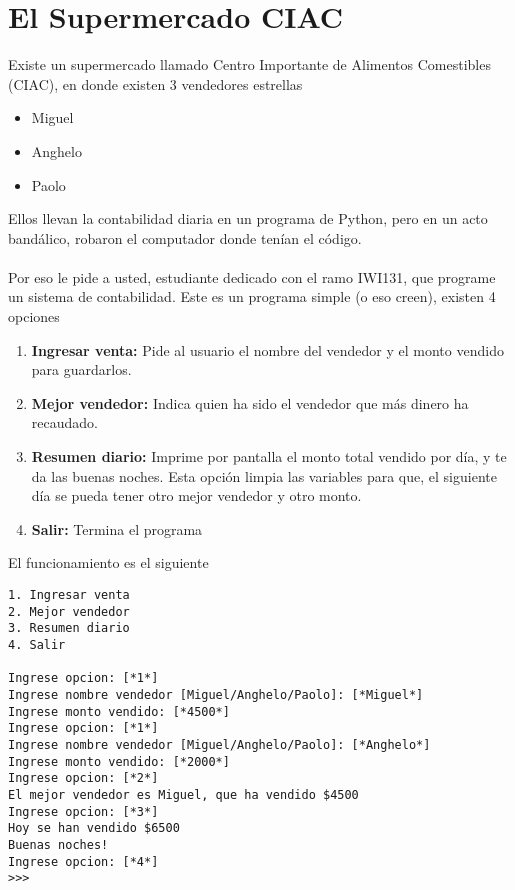 \section{El Supermercado CIAC}

Existe un supermercado llamado Centro Importante de Alimentos Comestibles (CIAC), en donde existen 3 vendedores estrellas
\begin{itemize}
    \item Miguel
    \item Anghelo
    \item Paolo
\end{itemize}

Ellos llevan la contabilidad diaria en un programa de Python, pero en un acto bandálico, robaron el computador donde tenían el código.
\\ \\   
Por eso le pide a usted, estudiante dedicado con el ramo IWI131, que programe un sistema de contabilidad. Este es un programa simple (o eso creen), existen 4 opciones

\begin{enumerate}
    \item \textbf{Ingresar venta:} Pide al usuario el nombre del vendedor y el monto vendido para guardarlos.
    \item \textbf{Mejor vendedor:} Indica quien ha sido el vendedor que más dinero ha recaudado.
    \item \textbf{Resumen diario:} Imprime por pantalla el monto total vendido por día, y te da las buenas noches. Esta opción limpia las variables para que, el siguiente día se pueda tener otro mejor vendedor y otro monto.
    \item \textbf{Salir:} Termina el programa
\end{enumerate}

El funcionamiento es el siguiente

\begin{lstlisting}[style=consola]
1. Ingresar venta
2. Mejor vendedor
3. Resumen diario
4. Salir

Ingrese opcion: [*1*]
Ingrese nombre vendedor [Miguel/Anghelo/Paolo]: [*Miguel*]
Ingrese monto vendido: [*4500*]
Ingrese opcion: [*1*]
Ingrese nombre vendedor [Miguel/Anghelo/Paolo]: [*Anghelo*]
Ingrese monto vendido: [*2000*]
Ingrese opcion: [*2*]
El mejor vendedor es Miguel, que ha vendido $4500
Ingrese opcion: [*3*]
Hoy se han vendido $6500
Buenas noches!
Ingrese opcion: [*4*]
>>>
\end{lstlisting}